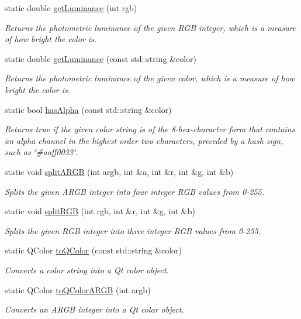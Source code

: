 \begin{DoxyCompactItemize}
static double \mbox{\hyperlink{classsgl_1_1GColor_abf11afacb5154dec7b8c4ba82ae4cb05}{get\+Luminance}} (int rgb)
\begin{DoxyCompactList}\small\item\em Returns the photometric luminance of the given R\+GB integer, which is a measure of how bright the color is. \end{DoxyCompactList}\item 
static double \mbox{\hyperlink{classsgl_1_1GColor_a677f43c53c7f2f5c5294cc23241cc9a7}{get\+Luminance}} (const std\+::string \&color)
\begin{DoxyCompactList}\small\item\em Returns the photometric luminance of the given color, which is a measure of how bright the color is. \end{DoxyCompactList}\item 
static bool \mbox{\hyperlink{classsgl_1_1GColor_ac3793cbac78369b75b4d8967d8cb2b7a}{has\+Alpha}} (const std\+::string \&color)
\begin{DoxyCompactList}\small\item\em Returns true if the given color string is of the 8-\/hex-\/character form that contains an alpha channel in the highest order two characters, preceded by a hash sign, such as \char`\"{}\#aaff0033\char`\"{}. \end{DoxyCompactList}\item 
static void \mbox{\hyperlink{classsgl_1_1GColor_aa0ad89394f00240bdc0ec3b893eca6aa}{split\+A\+R\+GB}} (int argb, int \&a, int \&r, int \&g, int \&b)
\begin{DoxyCompactList}\small\item\em Splits the given A\+R\+GB integer into four integer R\+GB values from 0-\/255. \end{DoxyCompactList}\item 
static void \mbox{\hyperlink{classsgl_1_1GColor_a32dea18e982a160b7b1ce8b4e881c0f9}{split\+R\+GB}} (int rgb, int \&r, int \&g, int \&b)
\begin{DoxyCompactList}\small\item\em Splits the given R\+GB integer into three integer R\+GB values from 0-\/255. \end{DoxyCompactList}\item 
static Q\+Color \mbox{\hyperlink{classsgl_1_1GColor_a23f62da01b905b62266904a01cfb3745}{to\+Q\+Color}} (const std\+::string \&color)
\begin{DoxyCompactList}\small\item\em Converts a color string into a Qt color object. \end{DoxyCompactList}\item 
static Q\+Color \mbox{\hyperlink{classsgl_1_1GColor_a979586dd4aaf299d42cf19619ee89280}{to\+Q\+Color\+A\+R\+GB}} (int argb)
\begin{DoxyCompactList}\small\item\em Converts an A\+R\+GB integer into a Qt color object. \end{DoxyCompactList}\end{DoxyCompactItemize}

